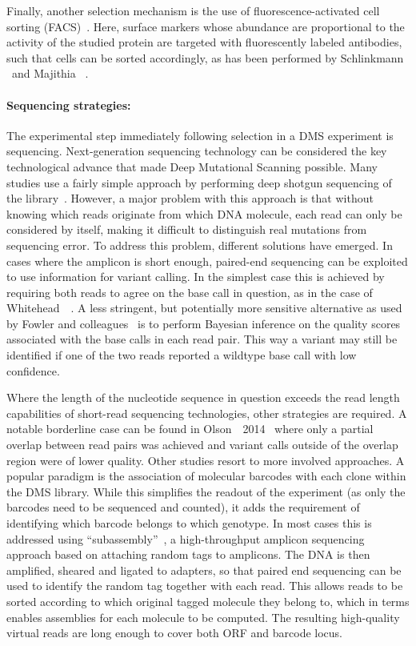 Finally, another selection mechanism is the use of fluorescence-activated cell sorting (FACS)~\cite{julius_demonstration_1972}. Here, surface markers whose abundance are proportional to the activity of the studied protein are targeted with fluorescently labeled antibodies, such that cells can be sorted accordingly, as has been performed by Schlinkmann \etal\ and Majithia \etal~\cite{schlinkmann_critical_2012,majithia_prospective_2016}.


\paragraph{Sequencing strategies:} The experimental step immediately following selection in a DMS experiment is sequencing. Next-generation sequencing technology can be considered the key technological advance that made Deep Mutational Scanning possible. Many studies use a fairly simple approach by performing deep shotgun sequencing of the library~\cite{ernst_coevolution_2010,hietpas_experimental_2011,fujino_robust_2012}. However, a major problem with this approach is that without knowing which reads originate from which DNA molecule, each read can only be considered by itself, making it difficult to distinguish real mutations from sequencing error. To address this problem, different solutions have emerged. In cases where the amplicon is short enough, paired-end sequencing can be exploited to use information for variant calling. In the simplest case this is achieved by requiring both reads to agree on the base call in question, as in the case of Whitehead~\etal~\cite{whitehead_optimization_2012}. A less stringent, but potentially more sensitive alternative as used by Fowler and colleagues~\cite{fowler_high-resolution_2010} is to perform Bayesian inference on the quality scores associated with the base calls in each read pair. This way a variant may still be identified if one of the two reads reported a wildtype base call with low confidence. 

Where the length of the nucleotide sequence in question exceeds the read length capabilities of short-read sequencing technologies, other strategies are required. A notable borderline case can be found in Olson~\etal~2014~\cite{olson_comprehensive_2014} where only a partial overlap between read pairs was achieved and variant calls outside of the overlap region were of lower quality. Other studies resort to more involved approaches. A popular paradigm is the association of molecular barcodes with each clone within the DMS library. While this simplifies the readout of the experiment (as only the barcodes need to be sequenced and counted), it adds the requirement of identifying which barcode belongs to which genotype. In most cases this is addressed using ``subassembly''~\cite{hiatt_parallel_2010}, a high-throughput amplicon sequencing approach based on attaching random tags to amplicons. The DNA is then amplified, sheared and ligated to adapters, so that paired end sequencing can be used to identify the random tag together with each read. This allows reads to be sorted according to which original tagged molecule they belong to, which in terms enables assemblies for each molecule to be computed. The resulting high-quality virtual reads are long enough to cover both ORF and barcode locus.

